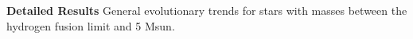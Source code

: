 \textbf{Detailed Results}
General evolutionary trends for stars with masses between the hydrogen fusion limit and 5 Msun.